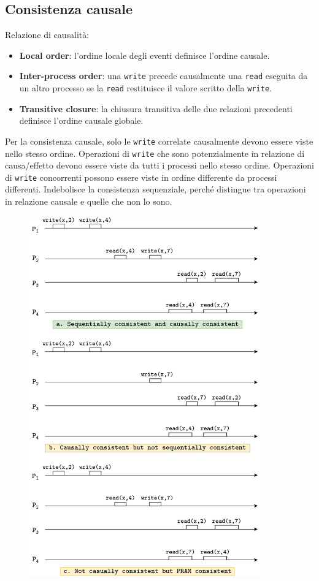 \subsection{Consistenza causale}
Relazione di causalità:
\begin{itemize}
    \item \textbf{Local order}: l'ordine locale degli eventi definisce l'ordine causale.
    \item \textbf{Inter-process order}: una \texttt{write} precede causalmente una \texttt{read} eseguita da un altro processo se la \texttt{read} restituisce il valore scritto della \texttt{write}. 
    \item \textbf{Transitive closure}: la chiusura transitiva delle due relazioni precedenti definisce l'ordine causale globale. 
\end{itemize}

Per la consistenza causale, solo le \texttt{write} correlate causalmente devono essere viste nello stesso ordine. Operazioni di \texttt{write} che sono potenzialmente in relazione di causa/effetto devono essere viste da tutti i processi nello stesso ordine. Operazioni di \texttt{write} concorrenti possono essere viste in ordine differente da processi differenti. Indebolisce la consistenza sequenziale, perché distingue tra operazioni in relazione causale e quelle che non lo sono.
\clearpage

\begin{figure}[ht]
    \centering
    \includegraphics[width=10cm]{./Images/cap2/2.25.png}
\end{figure}

